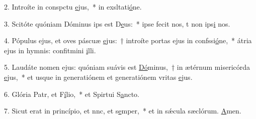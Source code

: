 2. Introíte in conspctu \uline{e}jus,~* in exsltati\uline{ó}ne.\par 
3. Scitóte quóniam Dóminus ips est D\uline{e}us:~* ipse fecit nos, t non ips\uline{i} nos.\par 
4. Pópulus ejus, et oves páscuæ \uline{e}jus:~† introíte portas ejus in confssi\uline{ó}ne,~* átria ejus in hymnis: confitmini \uline{i}lli.\par 
5. Laudáte nomen ejus: quóniam suávis est \uline{Dó}minus,~† in ætérnum misericórda \uline{e}jus,~* et usque in generatiónem et generatiónem vritas \uline{e}jus.\par 
6. Glória Patr, et F\uline{í}lio,~* et Spirtui S\uline{a}ncto.\par 
7. Sicut erat in princípio, et nnc, et s\uline{e}mper,~* et in sǽcula sæclórum. \uline{A}men.\par 
